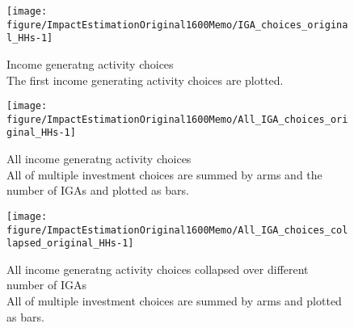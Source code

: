 \begin{Schunk}
\begin{figure}

{\centering \texttt{[image: figure/ImpactEstimationOriginal1600Memo/IGA\_choices\_original\_HHs-1]} 

}

\caption{Income generatng activity choices\\ {\footnotesize The first income generating activity choices are plotted.\setlength{\baselineskip}{8pt}}}\label{Figure IGA choices original HHs}
\end{figure}
\end{Schunk}
\begin{Schunk}
\begin{figure}

{\centering \texttt{[image: figure/ImpactEstimationOriginal1600Memo/All\_IGA\_choices\_original\_HHs-1]} 

}

\caption{All income generatng activity choices\\ {\footnotesize All of multiple investment choices are summed by arms and the number of IGAs and plotted as bars. \setlength{\baselineskip}{8pt}}}\label{Figure All IGA choices original HHs}
\end{figure}
\end{Schunk}
\begin{Schunk}
\begin{figure}

{\centering \texttt{[image: figure/ImpactEstimationOriginal1600Memo/All\_IGA\_choices\_collapsed\_original\_HHs-1]} 

}

\caption{All income generatng activity choices collapsed over different number of IGAs\\ {\footnotesize All of multiple investment choices are summed by arms and plotted as bars. \setlength{\baselineskip}{8pt}}}\label{Figure All IGA choices collapsed original HHs}
\end{figure}
\end{Schunk}

